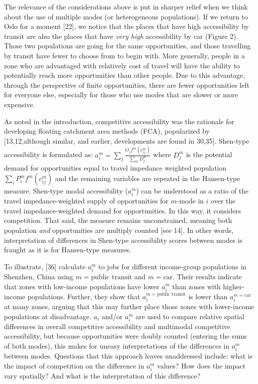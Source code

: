 \documentclass[10pt,letterpaper]{article}
\begin{document}
The relevance of the considerations above is put in sharper relief when
we think about the use of multiple modes (or heterogeneous populations).
If we return to Oslo for a moment {[}22{]}, we notice that the places
that have high accessibility by transit are also the places that have
\emph{very high} accessibility by car (Figure 2). Those two populations
are going for the same opportunities, and those travelling by transit
have fewer to choose from to begin with. More generally, people in a
zone who are advantaged with relatively cost of travel will have the
ability to potentially reach more opportunities than other people. Due
to this advantage, through the perspective of finite opportunities,
there are fewer opportunities left for everyone else, especially for
those who use modes that are slower or more expensive.

As noted in the introduction, competitive accessibility was the
rationale for developing floating catchment area methods (FCA),
popularized by {[}13,12,although similar, and earlier, developments are
found in 30,35{]}. Shen-type accessibility is formulated as:
\(a_i^m = \sum_j \frac{O_jf^m(c_{ij}^m)}{\sum_m D_j^m}\) where \(D_j^m\)
is the potential demand for opportunities equal to travel impedance
weighted population \(\sum_i P_i^m f^m(c_{ij}^m)\) and the remaining
variables are repeated in the Hansen-type measure. Shen-type modal
accessibility (\(a_i^m\)) can be understood as a ratio of the travel
impedance-weighted supply of opportunities for \(m\)-mode in \(i\) over
the travel impedance-weighted demand for opportunities. In this way, it
considers competition. That said, the measure remains unconstrained,
meaning both population \emph{and} opportunities are multiply counted
{[}see 14{]}. In other words, interpretation of differences in Shen-type
accessibility scores between modes is fraught as it is for Hansen-type
measures.

To illustrate, {[}36{]} calculate \(a_i^m\) to jobs for different
income-group populations in Shenzhen, China using
\(m = \text{public transit}\) and \(m=\text{car}\). Their results
indicate that zones with low-income populations have lower \(a_i^m\)
than zones with higher-income populations. Further, they show that
\(a_i^{m=\text{public transit}}\) is lower than \(a_i^{m=\text{car}}\)
at many zones, arguing that this may further place those zones with
lower-income populations at disadvantage. \(a_i\) and/or \(a_i^m\) are
used to compare relative spatial differences in overall competitive
accessibility and multimodal competitive accessibility, but because
opportunities were doubly counted (entering the sums of both modes),
this makes for uneasy interpretations of the differences in \(a_i^{m}\)
between modes. Questions that this approach leaves unaddressed include:
what is the impact of competition on the difference in \(a_i^m\) values?
How does the impact vary spatially? And what is the interpretation of
this difference?
\end{document}
